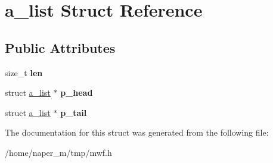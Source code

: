 \hypertarget{structa__list}{\section{a\-\_\-list Struct Reference}
\label{structa__list}
}
\subsection*{Public Attributes}
\begin{DoxyCompactItemize}
\item 
\hypertarget{structa__list_aaef1c0e5c7a0f4b00ceff817193b1a4c}{size\-\_\-t {\bfseries len}}\label{structa__list_aaef1c0e5c7a0f4b00ceff817193b1a4c}

\item 
\hypertarget{structa__list_adb74202ba10c126b81132768ab6e6f73}{struct \hyperlink{structa__list}{a\-\_\-list} $\ast$ {\bfseries p\-\_\-head}}\label{structa__list_adb74202ba10c126b81132768ab6e6f73}

\item 
\hypertarget{structa__list_ad643429379af15fbe85bebd2dad1ab13}{struct \hyperlink{structa__list}{a\-\_\-list} $\ast$ {\bfseries p\-\_\-tail}}\label{structa__list_ad643429379af15fbe85bebd2dad1ab13}

\end{DoxyCompactItemize}


The documentation for this struct was generated from the following file\-:\begin{DoxyCompactItemize}
\item 
/home/naper\-\_\-m/tmp/mwf.\-h\end{DoxyCompactItemize}
